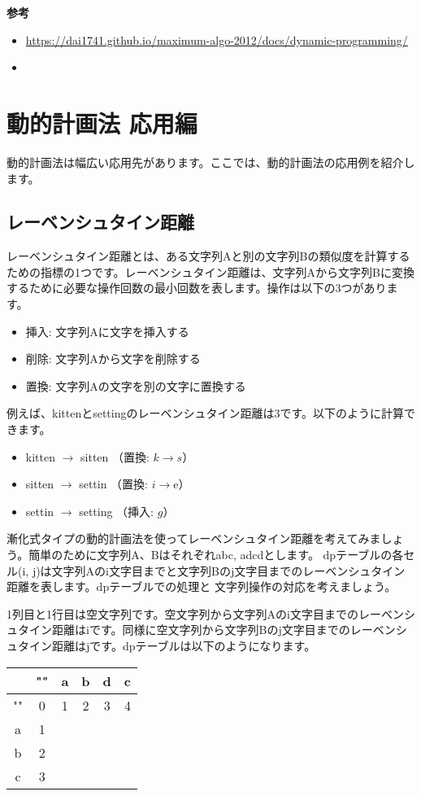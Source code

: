 \textbf{参考}
\begin{itemize}
  \item \url{https://dai1741.github.io/maximum-algo-2012/docs/dynamic-programming/}
  \item \url{}
\end{itemize}

\section{動的計画法 応用編}
動的計画法は幅広い応用先があります。ここでは、動的計画法の応用例を紹介します。
\subsection{レーベンシュタイン距離}
レーベンシュタイン距離とは、ある文字列Aと別の文字列Bの類似度を計算するための指標の1つです。レーベンシュタイン距離は、文字列Aから文字列Bに変換するために必要な操作回数の最小回数を表します。操作は以下の3つがあります。

\begin{itemize}
  \item 挿入: 文字列Aに文字を挿入する
  \item 削除: 文字列Aから文字を削除する
  \item 置換: 文字列Aの文字を別の文字に置換する
\end{itemize}

例えば、kittenとsettingのレーベンシュタイン距離は3です。以下のように計算できます。

\begin{itemize}
  \item kitten $\to$ sitten （置換: $k \to s$）
  \item sitten $\to$ settin （置換: $i \to $e）
  \item settin $\to$ setting （挿入: $g$）
\end{itemize}

漸化式タイプの動的計画法を使ってレーベンシュタイン距離を考えてみましょう。簡単のために文字列A、Bはそれぞれabc, adcdとします。
dpテーブルの各セル(i, j)は文字列Aのi文字目までと文字列Bのj文字目までのレーベンシュタイン距離を表します。dpテーブルでの処理と
文字列操作の対応を考えましょう。

1列目と1行目は空文字列です。空文字列から文字列Aのi文字目までのレーベンシュタイン距離はiです。同様に空文字列から文字列Bのj文字目までのレーベンシュタイン距離はjです。dpテーブルは以下のようになります。

\begin{table}[h]
  \centering
  \begin{tabular}{|c|c|c|c|c|c|}
    \hline
    & "" & a & b & d  & c\\
    \hline
    "" & 0 & 1 & 2 & 3 & 4\\
    \hline
    a & 1 &  &  &  & \\
    \hline
    b & 2 &  &  &  & \\
    \hline
    c & 3 &  &  &  & \\
    \hline
  \end{tabular}
\end{table}

